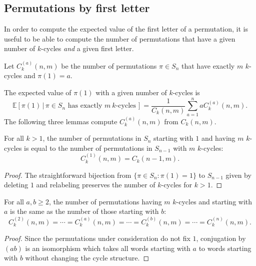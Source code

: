 \subsection{Permutations by first letter}
In order to compute the expected value of the first letter of a permutation,
it is useful to be able to compute the number of permutations that have a given
number of $k$-cycles \textit{and} a given first letter.
\begin{definition}
  Let $C_k^{(a)}(n,m)$ be the number of permutations $\pi \in S_n$ that
  have exactly $m$ $k$-cycles and $\pi(1) = a$.
\end{definition}
The expected value of $\pi(1)$ with a given number of
$k$-cycles
is
  \begin{equation}
    \mathbb{E}[\pi(1)\, |\, \pi \in S_n \text{ has exactly } m\ k \text{-cycles}\,] =
    \frac{1}{C_k(n, m)}\sum_{a=1}^n a C_k^{(a)}(n, m).
    \label{eq:weightedAverage}
  \end{equation}
The following three lemmas compute $C_k^{(a)}(n,m)$ from $C_k(n,m)$.
\begin{proposition}
  \label{cyc1Recurrence}
  For all $k > 1$, the number of permutations in $S_n$ starting with $1$ and
  having $m$ $k$-cycles is equal to the number of permutations in $S_{n-1}$ with
  $m$ $k$-cycles: \begin{equation}
    C_k^{(1)}(n,m) = C_k(n-1, m).
  \end{equation}
\end{proposition}
\begin{proof}
  The straightforward bijection from $\{\pi \in S_n : \pi(1) = 1\}$ to $S_{n-1}$
  given by deleting $1$ and relabeling preserves the number of $k$-cycles for
  $k > 1$.
\end{proof}
\begin{proposition}
  \label{allSame}
  For all $a, b \geq 2$, the number of permutations having $m$ $k$-cycles
  and starting with $a$ is the same as the number of those starting with $b$:
  \begin{equation}
    C_k^{(2)}(n,m) = \cdots = C_k^{(a)}(n,m) = \cdots = C_k^{(b)}(n,m) = \cdots = C_k^{(n)}(n,m).
  \end{equation}
\end{proposition}
\begin{proof}
  Since the permutations under consideration do not fix $1$,
  conjugation by $(ab)$ is an isomorphism which takes all words starting
  with $a$ to words starting with $b$ without changing the cycle structure.
\end{proof}
